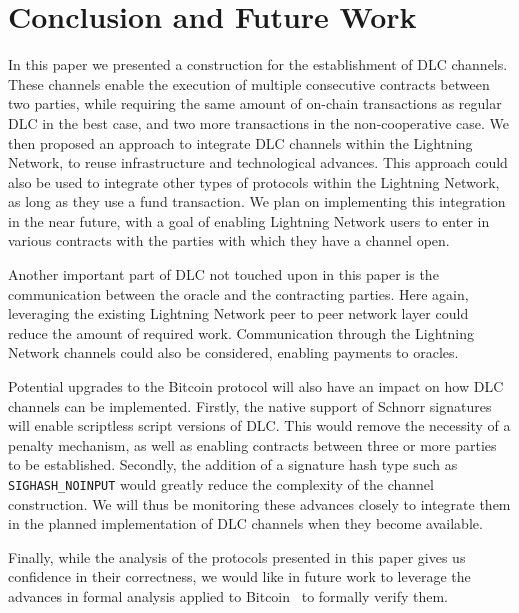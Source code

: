 \section{Conclusion and Future Work}\label{conclusion}

In this paper we presented a construction for the establishment of DLC channels.
These channels enable the execution of multiple consecutive contracts between two parties, while requiring the same amount of on-chain transactions as regular DLC in the best case, and two more transactions in the non-cooperative case.
We then proposed an approach to integrate DLC channels within the Lightning Network, to reuse infrastructure and technological advances.
This approach could also be used to integrate other types of protocols within the Lightning Network, as long as they use a fund transaction.
We plan on implementing this integration in the near future, with a goal of enabling Lightning Network users to enter in various contracts with the parties with which they have a channel open.

Another important part of DLC not touched upon in this paper is the communication between the oracle and the contracting parties.
Here again, leveraging the existing Lightning Network peer to peer network layer could reduce the amount of required work.
Communication through the Lightning Network channels could also be considered, enabling payments to oracles.

Potential upgrades to the Bitcoin protocol will also have an impact on how DLC channels can be implemented.
Firstly, the native support of Schnorr signatures will enable scriptless script versions of DLC.
This would remove the necessity of a penalty mechanism, as well as enabling contracts between three or more parties to be established.
Secondly, the addition of a signature hash type such as \texttt{SIGHASH\_NOINPUT} would greatly reduce the complexity of the channel construction.
We will thus be monitoring these advances closely to integrate them in the planned implementation of DLC channels when they become available.

Finally, while the analysis of the protocols presented in this paper gives us confidence in their correctness, we would like in future work to leverage the advances in formal analysis applied to Bitcoin~\cite{bartoletti2018bitml} to formally verify them.
